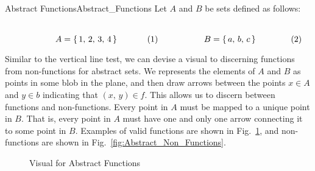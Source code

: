         \begin{lexample}{Abstract Functions}{Abstract_Functions}
            Let $A$ and $B$ be sets defined as follows:
            \par
            \begin{subequations}
                \begin{minipage}[b]{0.49\textwidth}
                    \centering
                    \begin{equation}
                        A=\{\,1,\,2,\,3,\,4\,\}
                    \end{equation}
                \end{minipage}
                \hfill
                \begin{minipage}[b]{0.49\textwidth}
                    \centering
                    \begin{equation}
                        B=\{\,a,\,b,\,c\,\}
                    \end{equation}
                \end{minipage}
            \end{subequations}
            \par\vspace{2.5ex}
            Similar to the vertical line test, we can devise a visual to
            discerning functions from non-functions for abstract sets.
            We represents the elements of $A$ and $B$ as points in some blob
            in the plane, and then draw arrows between the points
            $x\in{A}$ and $y\in{b}$ indicating that $(x,\,y)\in{f}$.
            This allows us to discern between functions and non-functions.
            Every point in $A$ must be mapped to a unique point in $B$.
            That is, every point in $A$ must have one and only one arrow
            connecting it to some point in $B$. Examples of valid functions
            are shown in Fig.~\ref{fig:Abstract_Functions}, and non-functions
            are shown in Fig.~\ref{fig:Abstract_Non_Functions}.
        \end{lexample}
        \begin{figure}[H]
            \centering
            \begin{subfigure}[b]{0.49\textwidth}
                \centering
                \resizebox{\textwidth}{!}{%
                    
                }
            \end{subfigure}
            \begin{subfigure}[b]{0.49\textwidth}
                \centering
                \resizebox{\textwidth}{!}{%
                    
                }
            \end{subfigure}
            \caption{Visual for Abstract Functions}
            \label{fig:Abstract_Functions}
        \end{figure}
